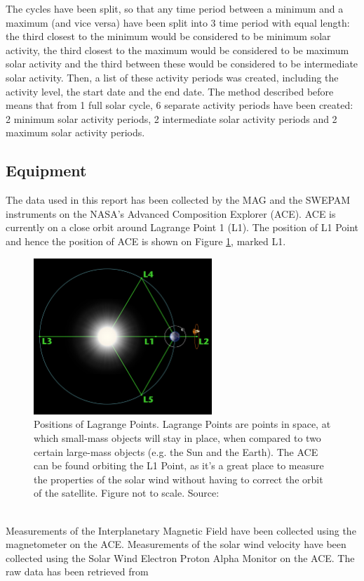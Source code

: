 \documentclass[12pt]{article}
\begin{document}
        The cycles have been split, so that any time period between a minimum and a maximum (and vice versa) have been split into 3 time period with equal length: the third closest to the minimum would be considered to be minimum solar activity, the third closest to the maximum would be considered to be maximum solar activity and the third between these would be considered to be intermediate solar activity. Then, a list of these activity periods was created, including the activity level, the start date and the end date. The method described before means that from 1 full solar cycle, 6 separate activity periods have been created: 2 minimum solar activity periods, 2 intermediate solar activity periods and 2 maximum solar activity periods.
    \subsection{Equipment}\label{sec:equipment}
        The data used in this report has been collected by the MAG and the SWEPAM instruments on the NASA's Advanced Composition Explorer (ACE)\cite{1998ace}. ACE is currently on a close orbit around Lagrange Point 1 (L1). The position of L1 Point and hence the position of ACE is shown on Figure \ref{fig:l1}, marked L1.\\
        \begin{figure}[t!]
            \centering
            \includegraphics[width=0.6\textwidth]{fig_theory/lagrange.jpg}
            \caption{Positions of Lagrange Points. Lagrange Points are points in space, at which small-mass objects will stay in place, when compared to two certain large-mass objects (e.g. the Sun and the Earth). The ACE can be found orbiting the L1 Point, as it's a great place to measure the properties of the solar wind without having to correct the orbit of the satellite. Figure not to scale. Source: \cite{lagrangeimage}}
            \label{fig:l1}
        \end{figure}\\
        Measurements of the Interplanetary Magnetic Field have been collected using the magnetometer on the ACE\cite{1998acemag}. Measurements of the solar wind velocity have been collected using the Solar Wind Electron Proton Alpha Monitor on the ACE\cite{1998aceswepam}. The raw data has been retrieved from 
\end{document}
